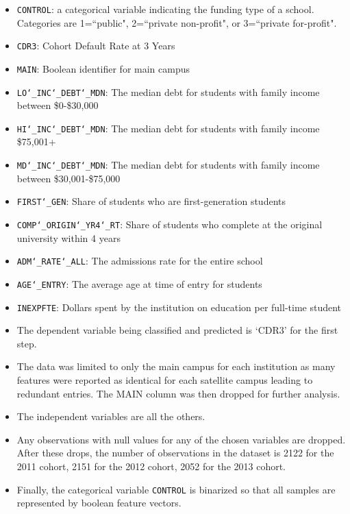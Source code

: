 \documentclass[10pt,twocolumn]{article}
\begin{document}
\begin{itemize}
\item \texttt{CONTROL}: a categorical variable indicating the funding type of a school.
Categories are 1=``public", 2=``private non-profit", or 3=``private for-profit".
\item \texttt{CDR3}: Cohort Default Rate at 3 Years
\item \texttt{MAIN}: Boolean identifier for main campus
\item \texttt{LO\char`_INC\char`_DEBT\char`_MDN}: The median debt for students with family income between \$0-\$30,000
\item \texttt{HI\char`_INC\char`_DEBT\char`_MDN}: The median debt for students with family income \$75,001+
\item \texttt{MD\char`_INC\char`_DEBT\char`_MDN}: The median debt for students with family income between \$30,001-\$75,000
\item \texttt{FIRST\char`_GEN}: Share of students who are first-generation students
\item \texttt{COMP\char`_ORIGIN\char`_YR4\char`_RT}:  Share of students who complete at the original university within 4 years
\item \texttt{ADM\char`_RATE\char`_ALL}: The admissions rate for the entire school
\item \texttt{AGE\char`_ENTRY}: The average age at time of entry for students
\item \texttt{INEXPFTE}: Dollars spent by the institution on education per full-time student
\item The dependent variable being classified and predicted is `CDR3' for the first step.
\item The data was limited to only the main campus for each institution as many features
were reported as identical for each satellite campus leading to redundant entries.
The MAIN column was then dropped for further analysis.
\item The independent variables are all the others.
\item Any observations with null values for any of the chosen variables
are dropped. After these drops, the number of observations
in the dataset is 2122 for the 2011 cohort, 2151 for the 2012 cohort, 2052 for the
2013 cohort.
\item Finally, the categorical variable \texttt{CONTROL} is binarized so that all samples
are represented by boolean feature vectors.
\end{itemize}
\end{document}
